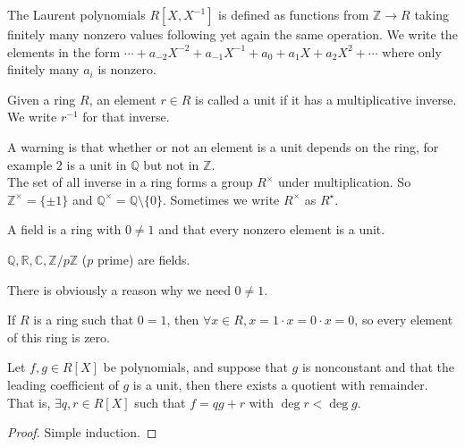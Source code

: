 \begin{definition}
    The Laurent polynomials $R[X,X^{-1}]$ is defined as functions from $\mathbb Z\to R$ taking finitely many nonzero values following yet again the same operation.
    We write the elements in the form $\cdots +a_{-2}X^{-2}+a_{-1}X^{-1}+a_0+a_1X+a_2X^2+\cdots$ where only finitely many $a_i$ is nonzero.
\end{definition}
\begin{definition}
    Given a ring $R$, an element $r\in R$ is called a unit if it has a multiplicative inverse.
    We write $r^{-1}$ for that inverse.
\end{definition}
A warning is that whether or not an element is a unit depends on the ring, for example $2$ is a unit in $\mathbb Q$ but not in $\mathbb Z$.\\
The set of all inverse in a ring forms a group $R^\times$ under multiplication.
So $\mathbb Z^\times=\{\pm 1\}$ and $\mathbb Q^\times=\mathbb Q\setminus\{0\}$.
Sometimes we write $R^\times$ as $R^\star$.
\begin{definition}
    A field is a ring with $0\neq 1$ and that every nonzero element is a unit.
\end{definition}
\begin{example}
    $\mathbb Q,\mathbb R,\mathbb C,\mathbb Z/p\mathbb Z$ ($p$ prime) are fields.
\end{example}
There is obviously a reason why we need $0\neq 1$.
\begin{remark}
    If $R$ is a ring such that $0=1$, then $\forall x\in R,x=1\cdot x=0\cdot x=0$, so every element of this ring is zero.
\end{remark}
\begin{lemma}
    Let $f,g\in R[X]$ be polynomials, and suppose that $g$ is nonconstant and that the leading coefficient of $g$ is a unit, then there exists a quotient with remainder.
    That is, $\exists q,r\in R[X]$ such that $f=qg+r$ with $\deg r<\deg g$.
\end{lemma}
\begin{proof}
    Simple induction.
\end{proof}
